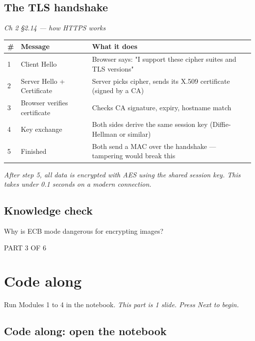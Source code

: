 \documentclass[12pt,openany]{book}
\begin{document}
\subsection*{The TLS handshake}
{\small\itshape\color{gray}Ch 2 §2.14 --- how HTTPS works}

\begin{center}\small\begin{tabular}{p{4.3cm}p{4.3cm}p{4.3cm}}\toprule
\textbf{\#} & \textbf{Message} & \textbf{What it does} \\ \midrule
1 & Client Hello & Browser says: "I support these cipher suites and TLS versions" \\
2 & Server Hello + Certificate & Server picks cipher, sends its X.509 certificate (signed by a CA) \\
3 & Browser verifies certificate & Checks CA signature, expiry, hostname match \\
4 & Key exchange & Both sides derive the same session key (Diffie-Hellman or similar) \\
5 & Finished & Both send a MAC over the handshake --- tampering would break this \\
\bottomrule\end{tabular}\end{center}

{\small\itshape\color{gray}After step 5, all data is encrypted with AES using the shared session key. This takes under 0.1 seconds on a modern connection.}

\medskip

\subsection*{Knowledge check}

Why is ECB mode dangerous for encrypting images?

\vspace{4pt}\noindent\textsc{PART 3 OF 6}


\section*{Code along}

Run Modules 1 to 4 in the notebook.
{\small\itshape\color{gray}This part is 1 slide. Press Next to begin.}

\medskip

\subsection*{Code along: open the notebook}
\end{document}
